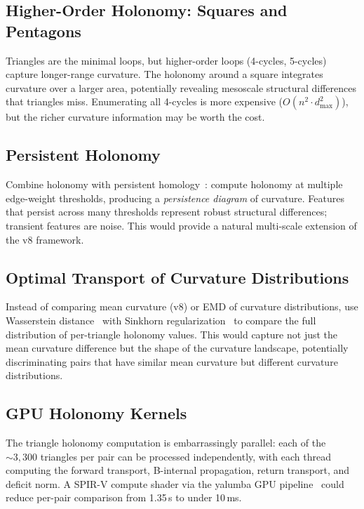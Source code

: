 \documentclass{../yalumba}
\begin{document}
\subsection{Higher-Order Holonomy: Squares and Pentagons}

Triangles are the minimal loops, but higher-order loops (4-cycles, 5-cycles)
capture longer-range curvature.  The holonomy around a square integrates
curvature over a larger area, potentially revealing mesoscale structural
differences that triangles miss.  Enumerating all 4-cycles is more expensive
($O(n^2 \cdot d_{\max}^2)$), but the richer curvature information may be
worth the cost.

\subsection{Persistent Holonomy}

Combine holonomy with persistent homology~\cite{edelsbrunner2010computational}:
compute holonomy at multiple edge-weight thresholds, producing a
\emph{persistence diagram} of curvature.  Features that persist across
many thresholds represent robust structural differences; transient features
are noise.  This would provide a natural multi-scale extension of the v8
framework.

\subsection{Optimal Transport of Curvature Distributions}

Instead of comparing mean curvature (v8) or EMD of curvature distributions,
use Wasserstein distance~\cite{peyre2019computational} with Sinkhorn
regularization~\cite{cuturi2013sinkhorn} to compare the full distribution
of per-triangle holonomy values.  This would capture not just the mean
curvature difference but the shape of the curvature landscape, potentially
discriminating pairs that have similar mean curvature but different curvature
distributions.

\subsection{GPU Holonomy Kernels}

The triangle holonomy computation is embarrassingly parallel: each of the
$\sim 3{,}300$ triangles per pair can be processed independently, with each
thread computing the forward transport, B-internal propagation, return
transport, and deficit norm.  A SPIR-V compute shader via the yalumba GPU
pipeline~\cite{nakahara2003geometry} could reduce per-pair comparison from
1.35\,s to under 10\,ms.
\end{document}

